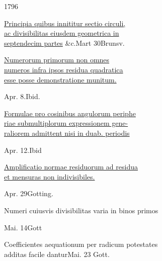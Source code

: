 \clearpage{}\NoSourceHead
\begingroup\itshape
\begin{center}1796\end{center}
\noindent\makebox[1.2em][l]{\(\ast\)}\underline{Principia quibus innititur sectio circuli,}\\
\hspace*{2em}\underline{ac divisibilitas eiusdem geometrica in}\\
\hspace*{2em}\underline{septendecim partes} \&c.\hfill Mart 30\quad Brunsv.

\medskip
\noindent\makebox[1.2em][l]{\(\ast\)}\underline{Numerorum primorum non omnes}\\
\hspace*{2em}\underline{numeros infra ipsos residua quadratica}\\
\hspace*{2em}\underline{esse posse demonstratione munitum.}
\begin{flushright}Apr. 8.\quad Ibid.\end{flushright}

\noindent\underline{Formulae pro cosinibus angulorum periphe}\\
\hspace*{2em}\underline{riae submultiplorum expressionem gene-}\\
\hspace*{2em}\underline{raliorem admittent nisi in duab. periodis}
\begin{flushright}Apr. 12.\quad Ibid\end{flushright}

\noindent{}\underline{Amplificatio normae residuorum ad residua}\\
\hspace*{2em}\underline{et mensuras non indivisibiles.}
\begin{flushright}Apr. 29\quad Gotting.\end{flushright}

\noindent Numeri cuiusvis divisibilitas varia in binos primos
\begin{flushright}Mai. 14\quad Gott\end{flushright}

\noindent{}Coefficientes aequationum per radicum potestates\\
\hspace*{2em}additas facile dantur\hfill Mai. 23 Gott.

